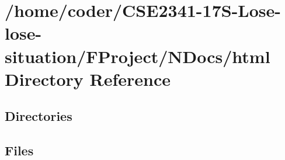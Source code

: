 \section{/home/coder/\+C\+S\+E2341-\/17\+S-\/\+Lose-\/lose-\/situation/\+F\+Project/\+N\+Docs/html Directory Reference}
\label{dir_f401a59334519e92f07207ed2cc4191f}
\subsection*{Directories}
\begin{DoxyCompactItemize}
\end{DoxyCompactItemize}
\subsection*{Files}
\begin{DoxyCompactItemize}
\end{DoxyCompactItemize}
